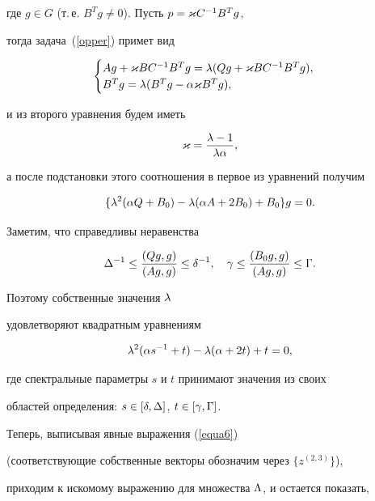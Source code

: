 \begin{pf}
где $g \in G $ (т.\,е. $ B^Tg \neq 0$). Пусть $p=\varkappa C^{-1} B^T g$,


тогда задача~(\ref{opper}) примет вид


$$


\begin{cases}


A g + \kpp B C^{-1} B^T g = \zl ( Q g + \kpp B C^{-1} B^T g ),\\


B^T g = \zl ( B^T g - \za \kpp B^T g),


\end{cases}


$$


и из второго уравнения будем иметь


$$


\kpp = \dfrac{\zl - 1}{\zl \za},


$$


а после подстановки этого соотношения в первое из уравнений получим


$$


\{\zl^2(\za Q + B_0) -\zl ( \za A + 2 B_0 ) +B_0 \} g = 0 .


$$




Заметим, что справедливы неравенства


$$


\zD^{-1} \leq \dfrac{(Qg,g)}{(Ag,g)} \leq \zd^{-1}, \quad


\zg \leq \dfrac{(B_0g,g)}{(Ag,g)} \leq \zG .


$$


Поэтому собственные значения $\lambda$


удовлетворяют квадратным уравнениям 


$$


\zl^2(\za s^{-1}+t) - \zl ( \za + 2 t ) +


t = 0 ,


$$


где спектральные параметры $s$ и $t$ принимают значения из своих


областей определения: $s \in [\delta,\Delta]$, $t \in [\gamma,\Gamma]$.


Теперь, выписывая явные выражения (\ref{equa6})


(соответствующие собственные векторы обозначим через $\{z^{(2,3)}\}$),


приходим к искомому выражению для множества $\Lambda$, и остается показать,



\end{pf}
